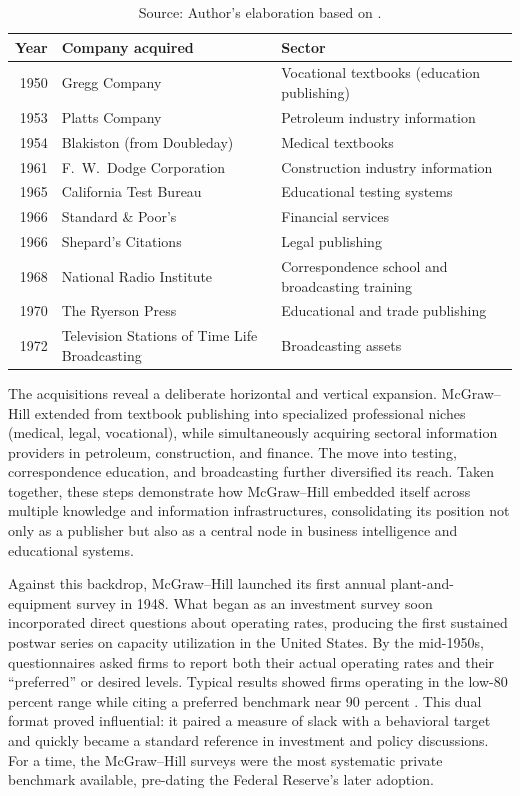 \documentclass[11pt]{article}
\begin{document}
\begin{table}[h!]
\centering
\caption{McGraw--Hill Acquisitions, 1950--1972}
\label{tab:mcgrawhill_acquisitions}
\begin{tabular}{rp{4cm}p{5cm}}
\toprule
Year & Company acquired & Sector \\
\midrule
1950 & Gregg Company & Vocational textbooks (education publishing) \\
1953 & Platts Company & Petroleum industry information \\
1954 & Blakiston (from Doubleday) & Medical textbooks \\
1961 & F.\ W.\ Dodge Corporation & Construction industry information \\
1965 & California Test Bureau & Educational testing systems \\
1966 & Standard \& Poor's & Financial services \\
1966 & Shepard's Citations & Legal publishing \\
1968 & National Radio Institute & Correspondence school and broadcasting training \\
1970 & The Ryerson Press & Educational and trade publishing \\
1972 & Television Stations of Time Life Broadcasting & Broadcasting assets \\
\bottomrule
\end{tabular}
\captionsetup{font=small}
\caption*{Source: Author's elaboration based on \citet{munroe2007}.}
\end{table}

The acquisitions reveal a deliberate horizontal and vertical expansion. McGraw--Hill extended from textbook publishing into specialized professional niches (medical, legal, vocational), while simultaneously acquiring sectoral information providers in petroleum, construction, and finance. The move into testing, correspondence education, and broadcasting further diversified its reach. Taken together, these steps demonstrate how McGraw--Hill embedded itself across multiple knowledge and information infrastructures, consolidating its position not only as a publisher but also as a central node in business intelligence and educational systems.

Against this backdrop, McGraw--Hill launched its first annual plant-and-equipment survey in 1948. What began as an investment survey soon incorporated direct questions about operating rates, producing the first sustained postwar series on capacity utilization in the United States. By the mid-1950s, questionnaires asked firms to report both their actual operating rates and their ``preferred'' or desired levels. Typical results showed firms operating in the low-80 percent range while citing a preferred benchmark near 90 percent \citep{butler1958,phillips1963}. This dual format proved influential: it paired a measure of slack with a behavioral target and quickly became a standard reference in investment and policy discussions. For a time, the McGraw--Hill surveys were the most systematic private benchmark available, pre-dating the Federal Reserve's later adoption.
\end{document}
